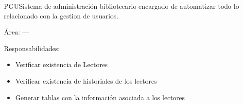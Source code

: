 \begin{Actor}{PGU}{Sistema de administración bibliotecario encargado de automatizar todo lo relacionado con la gestion de usuarios.}
	\item[Área:] ---
	\item[Responsabilidades:] \hspace{1pt}
	\begin{itemize}
		\item Verificar existencia de Lectores
		\item Verificar existencia de historiales de los lectores
		\item Generar tablas con la información asociada a los lectores
			\end{itemize}
\end{Actor}


